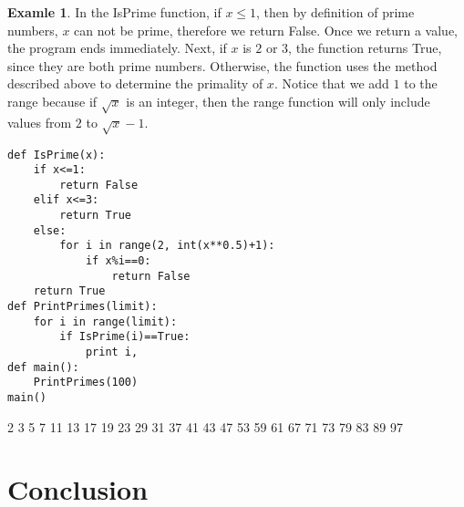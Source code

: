 \documentclass[12pt,openany]{book} %
\theoremstyle{definition}
\newtheorem{soln}{\textbf{Exam\smash{p}le} \nolinebreak }[section]
\newcounter{code}[section]
\begin{document}
\begin{soln}
In the IsPrime function, if $x\le 1$, then by definition of prime numbers, $x$ can not be prime, therefore we return False.  Once we return a value, the program ends immediately.  Next, if $x$ is $2$ or $3$, the function returns True, since they are both prime numbers.  Otherwise, the function uses the method described above to determine the primality of $x$.  Notice that we add $1$ to the range because if $\sqrt{x}$ is an integer, then the range function will only include values from $2$ to $\sqrt{x}-1$.
\end{soln} 
\begin{code}{}{}
\begin{lstlisting}
def IsPrime(x):
	if x<=1:
		return False
	elif x<=3:
		return True
	else:
		for i in range(2, int(x**0.5)+1):
			if x%i==0:
				return False
	return True 
def PrintPrimes(limit):
	for i in range(limit):
		if IsPrime(i)==True:
			print i,
def main():
	PrintPrimes(100)
main()
\end{lstlisting} \end{code}
\begin{out}{}{}2 3 5 7 11 13 17 19 23 29 31 37 41 43 47 53 59 61 67 71 73 79 83 89 97 \end{out}



\section{Conclusion}
\end{document}
